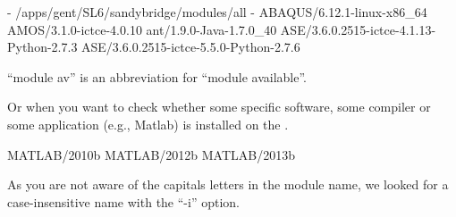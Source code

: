 \begin{prompt}
- /apps/gent/SL6/sandybridge/modules/all -
ABAQUS/6.12.1-linux-x86_64
AMOS/3.1.0-ictce-4.0.10
ant/1.9.0-Java-1.7.0_40
ASE/3.6.0.2515-ictce-4.1.13-Python-2.7.3
ASE/3.6.0.2515-ictce-5.5.0-Python-2.7.6
\end{prompt}

``module av'' is an abbreviation for ``module available''.

Or when you want to check whether some specific software, some compiler or some
application (e.g., Matlab) is installed on the \hpc.

\begin{prompt}
MATLAB/2010b
MATLAB/2012b
MATLAB/2013b
\end{prompt}

As you are not aware of the capitals letters in the module name, we looked for
a case-insensitive name with the ``-i'' option.
